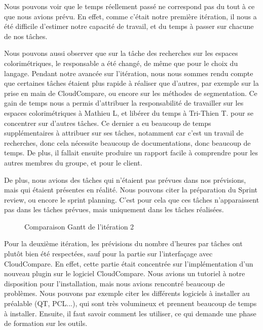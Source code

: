 \documentclass[12pt,titlepage,french]{article}
\begin{document}
Nous pouvons voir que le temps réellement passé ne correspond pas du tout à ce que nous avions prévu. En effet, comme c'était notre première itération, il nous a été difficile d'estimer notre capacité de travail, et du temps à passer sur chacune de nos tâches. \newline

Nous pouvons aussi observer que sur la tâche des recherches sur les espaces colorimétriques, le responsable a été changé, de même que pour le choix du langage. Pendant notre avancée sur l'itération, nous nous sommes rendu compte que certaines tâches étaient plus rapide à réaliser que d'autres, par exemple sur la prise en main de CloudCompare, ou encore sur les méthodes de segmentation. Ce gain de temps nous a permis d'attribuer la responsabilité de travailler sur les espaces colorimétriques à Mathieu L, et libérer du temps à Tri-Thien T. pour se concentrer sur d'autres tâches. Ce dernier a eu beaucoup de temps supplémentaires à attribuer sur ses tâches, notamment car c'est un travail de recherches, donc cela nécessite beaucoup de documentations, donc beaucoup de temps. De plus, il fallait ensuite produire un rapport facile à comprendre pour les autres membres du groupe, et pour le client. \newline

De plus, nous avions des tâches qui n'étaient pas prévues dans nos prévisions, mais qui étaient présentes en réalité. Nous pouvons citer la préparation du Sprint review, ou encore le sprint planning. C'est pour cela que ces tâches n'apparaissent pas dans les tâches prévues, mais uniquement dans les tâches réalisées.

\begin{figure}[H]
    \caption{\label{} Comparaison Gantt de l'itération 2}
\end{figure}

Pour la deuxième itération, les prévisions du nombre d'heures par tâches ont plutôt bien été respectées, sauf pour la partie sur l'interfaçage avec CloudCompare. En effet, cette partie était concentrée sur l'implémentation d'un nouveau plugin sur le logiciel CloudCompare. Nous avions un tutoriel à notre disposition pour l'installation, mais nous avions rencontré beaucoup de problèmes. Nous pouvons par exemple citer les différents logiciels à installer au préalable (QT, PCL...), qui sont très volumineux et prennent beaucoup de temps à installer. Ensuite, il faut savoir comment les utiliser, ce qui demande une phase de formation sur les outils. \newline
\end{document}
